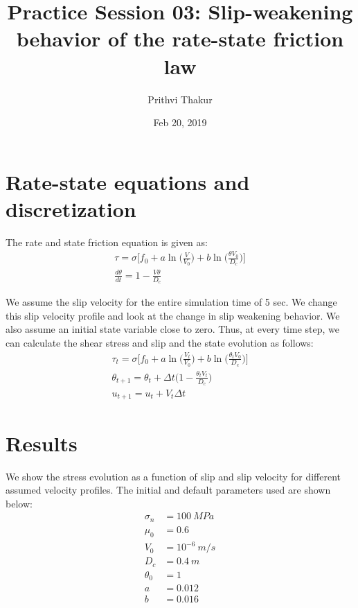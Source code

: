 \documentclass[11pt]{article}
\title{Practice Session 03: Slip-weakening behavior of the rate-state friction law}
\author{Prithvi Thakur}
\date{Feb 20, 2019}
\begin{document}
\maketitle

\section*{Rate-state equations and discretization}
The rate and state friction equation is given as:
\begin{equation}
\begin{aligned}
\tau = \sigma\big[f_0 + a\ln\big(\frac{V}{V_0}\big) + b\ln\big(\frac{\theta V_0}{D_c}\big)  \big] 
\\
\frac{d\theta}{dt} = 1 - \frac{V\theta}{D_c}
\end{aligned}
\end{equation}

We assume the slip velocity for the entire simulation time of 5 sec. We change this slip velocity profile and look at the change in slip weakening behavior. We also assume an initial state variable close to zero. Thus, at every time step, we can calculate the shear stress and slip and the state evolution as follows:
\begin{equation}
    \begin{aligned}
        \tau_t = \sigma\big[f_0 + a\ln\big(\frac{V_t}{V_0}\big) + b\ln\big(\frac{\theta_t V_0}{D_c}\big)  \big] 
        \\
        \theta_{t+1} = \theta_t + \Delta t \big(1 - \frac{\theta_t V_t}{D_c}\big)
        \\
        u_{t+1} = u_t + V_t \Delta t
        
    \end{aligned}
\end{equation}

\section*{Results}
We show the stress evolution as a function of slip and slip velocity for different assumed velocity profiles. The initial and default parameters used are shown below:
\begin{equation}
    \begin{aligned}
        \sigma_n &= 100\ MPa \\
        \mu_0 &= 0.6 \\
        V_0 &= 10^{-6}\ m/s \\
        D_c &= 0.4\ m \\
        \theta_0 &= 1 \\
        a &= 0.012 \\
        b &= 0.016 \\
    \end{aligned}

\end{equation}
\end{document}
